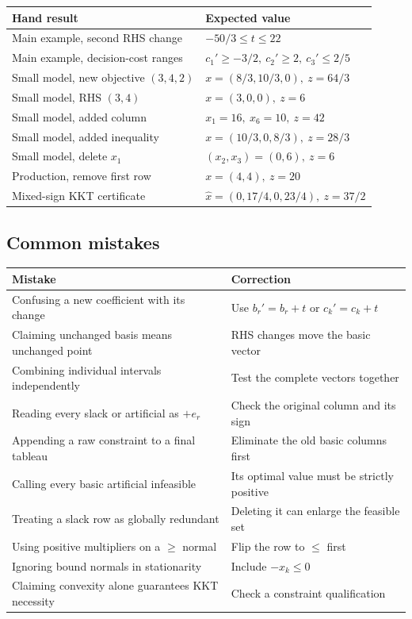 \documentclass[11pt,a4paper]{article}
\begin{document}
\begin{center}
  \begin{tabular}{>{\raggedright\arraybackslash}p{7.2cm}l}\toprule
    Hand result & Expected value\\\midrule
    Main example, second RHS change & $-50/3\leq t\leq22$\\
    Main example, decision-cost ranges & $c_1'\geq-3/2,\ c_2'\geq2,\ c_3'\leq2/5$\\
    Small model, new objective $(3,4,2)$ & $x=(8/3,10/3,0),\ z=64/3$\\
    Small model, RHS $(3,4)$ & $x=(3,0,0),\ z=6$\\
    Small model, added column & $x_1=16,\ x_6=10,\ z=42$\\
    Small model, added inequality & $x=(10/3,0,8/3),\ z=28/3$\\
    Small model, delete $x_1$ & $(x_2,x_3)=(0,6),\ z=6$\\
    Production, remove first row & $x=(4,4),\ z=20$\\
    Mixed-sign KKT certificate & $\hat x=(0,17/4,0,23/4),\ z=37/2$\\\bottomrule
  \end{tabular}
\end{center}

\subsection{Common mistakes}
\begin{center}
  \begin{tabular}{>{\raggedright\arraybackslash}p{6.3cm}>{\raggedright\arraybackslash}p{6.8cm}}\toprule
    Mistake & Correction\\\midrule
    Confusing a new coefficient with its change & Use $b_r'=b_r+t$ or $c_k'=c_k+t$\\
    Claiming unchanged basis means unchanged point & RHS changes move the basic vector\\
    Combining individual intervals independently & Test the complete vectors together\\
    Reading every slack or artificial as $+e_r$ & Check the original column and its sign\\
    Appending a raw constraint to a final tableau & Eliminate the old basic columns first\\
    Calling every basic artificial infeasible & Its optimal value must be strictly positive\\
    Treating a slack row as globally redundant & Deleting it can enlarge the feasible set\\
    Using positive multipliers on a $\geq$ normal & Flip the row to $\leq$ first\\
    Ignoring bound normals in stationarity & Include $-x_k\leq0$\\
    Claiming convexity alone guarantees KKT necessity & Check a constraint qualification\\\bottomrule
  \end{tabular}
\end{center}
\end{document}
